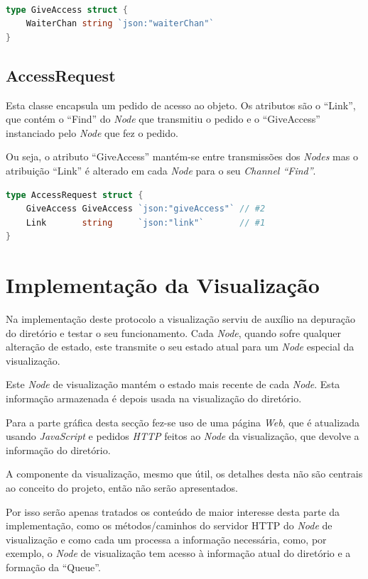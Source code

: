 \begin{lstlisting}[caption={\emph{Struct} ``GiveAccess''},language=Go]

type GiveAccess struct {
	WaiterChan string `json:"waiterChan"`
}

\end{lstlisting}


\subsection*{AccessRequest}
Esta classe encapsula um pedido de acesso ao objeto. Os atributos são o ``Link'', que contém o ``Find'' do \emph{Node} que transmitiu o pedido e 
o ``GiveAccess'' instanciado pelo \emph{Node} que fez o pedido.

Ou seja, o atributo ``GiveAccess'' mantém-se entre transmissões dos \emph{Nodes} mas o atribuição ``Link'' é alterado em cada \emph{Node} para o 
seu \emph{Channel ``Find''}.

\begin{lstlisting}[caption={\emph{Struct} ``GiveAccess''},language=Go]
type AccessRequest struct {
	GiveAccess GiveAccess `json:"giveAccess"` // #2
	Link       string     `json:"link"`       // #1
}
\end{lstlisting}




\section{Implementação da Visualização}
\label{implementacao:sec:implementacao_visualizacao}
Na implementação deste protocolo a visualização serviu de auxílio na depuração do diretório e testar o seu funcionamento.
Cada \emph{Node}, quando sofre qualquer alteração de estado, este transmite o seu estado atual para um \emph{Node} especial da visualização.

Este \emph{Node} de visualização mantém o estado mais recente de cada \emph{Node}. 
Esta informação armazenada é depois usada na visualização do diretório.

Para a parte gráfica desta secção fez-se uso de uma página \emph{Web}, que é atualizada usando \emph{JavaScript} e 
pedidos \emph{HTTP} feitos ao \emph{Node} da visualização, que devolve a informação do diretório.

A componente da visualização, mesmo que útil, os detalhes desta não são centrais ao conceito do projeto, então não serão apresentados. 

Por isso serão apenas tratados os conteúdo de maior interesse desta parte da implementação, como os métodos/caminhos do servidor \acs{HTTP} do \emph{Node} de visualização e como cada um processa a informação necessária, como, por exemplo, o \emph{Node} de visualização tem acesso à informação atual do diretório e a formação da ``Queue''.



